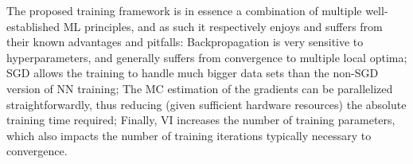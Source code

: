 \documentclass[11pt]{article}
\begin{document}
The proposed training framework is in essence a combination of multiple
well-established ML principles, and as such it respectively enjoys and suffers
from their known advantages and pitfalls: Backpropagation is very sensitive to
hyperparameters, and generally suffers from convergence to multiple local
optima; SGD allows the training to handle much bigger data sets than the
non-SGD version of NN training; The MC estimation of the gradients can be
parallelized straightforwardly, thus reducing (given sufficient hardware
resources) the absolute training time required; Finally, VI increases the
number of training parameters, which also impacts the number of training
iterations typically necessary to convergence.



 
\end{document}
